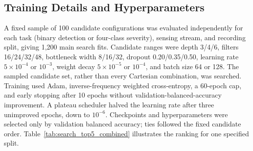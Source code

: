 \documentclass[letterpaper,journal]{IEEEtran}
\begin{document}
\subsection{Training Details and Hyperparameters}
\label{sec:training_details}

A fixed sample of 100 candidate configurations was evaluated independently for each task (binary detection or four-class severity), sensing stream, and recording split, giving 1,200 main search fits. Candidate ranges were depth 3/4/6, filters 16/24/32/48, bottleneck width 8/16/32, dropout 0.20/0.35/0.50, learning rate $5\times10^{-4}$ or $10^{-3}$, weight decay $5\times10^{-5}$ or $10^{-4}$, and batch size 64 or 128. The sampled candidate set, rather than every Cartesian combination, was searched. Training used Adam, inverse-frequency weighted cross-entropy, a 60-epoch cap, and early stopping after 10 epochs without validation-balanced-accuracy improvement. A plateau scheduler halved the learning rate after three unimproved epochs, down to $10^{-6}$. Checkpoints and hyperparameters were selected only by validation balanced accuracy; ties followed the fixed candidate order. Table~\ref{tab:search_top5_combined} illustrates the ranking for one specified split.
\end{document}
